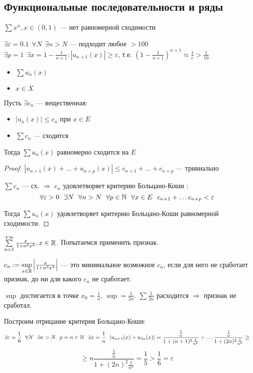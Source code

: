 

\cfoot{}



\subsection*{Функциональные последовательности и ряды}

\begin{example}
	$\sum x^n, x\in (0, 1)$ --- нет равномерной сходимости

	$\exists \varepsilon = 0.1 \ \ \forall N \ \ \exists n>N$ --- подходит любое $>100$ $\exists p = 1 \ \ \exists x = 1 - \frac{1}{n+1} : |u_{n+1}(x)| \ge \varepsilon$, т.е. $\left(1 - \frac{1}{n+1}\right)^{n+1} \approx \frac{1}{e} > \frac{1}{10}$
\end{example}

\begin{theorem}\itemfix
	\begin{itemize}
		\item $\sum u_n(x)$
		\item $x\in X$
	\end{itemize}
	Пусть $\exists c_n$ --- вещественная:
	\begin{itemize}
		\item $|u_n(x)| \le c_n$ при $x\in E$
		\item $\sum c_n$ --- сходится
	\end{itemize}
	Тогда $\sum u_n(x)$ равномерно сходится на $E$
\end{theorem}
\begin{proof}
	$|u_{n+1}(x) + \ldots + u_{n+p}(x)| \le c_{n+1} + \ldots + c_{n+p}$ --- тривиально

	$\sum c_n$ --- сх. $\Rightarrow$ $c_n$ удовлетворяет критерию Больцано-Коши : $$\forall \varepsilon > 0 \ \ \exists N \ \ \forall n > N \ \ \forall p\in \N \ \ \forall x\in E \ \ c_{n+1} + \ldots c_{n+p} < \varepsilon$$

	Тогда $\sum u_n(x)$ удовлетворяет критерию Больцано-Коши равномерной сходимости.
\end{proof}

\begin{example}
	$\sum\limits_{n=1}^{+\infty} \frac{x}{1+n^2x^2}, x\in\mathbb{R}$. Попытаемся применить признак.

	$c_n := \sup\limits_{x\in \mathbb{R}} \left|\frac{x}{1+n^2x^2}\right|$ --- это минимальное возможное $c_n$, если для него не сработает признак, до ни для какого $c_n$ не сработает.

	$\sup$ достигается в точке $x_0 = \frac{1}{n}$, $\sup = \frac{1}{2n}$. $\sum \frac{1}{2n}$ расходится $\Rightarrow$ признак не сработал.

	Построим отрицание критерия Больцано-Коши:
	$$\exists \varepsilon = \frac{1}{6} \ \ \forall N \ \ \exists n>N \ \ p=n\in\N \ \ \exists x=\frac{1}{n} \ \ |u_{n+1}(x) + u_{2n}(x)| = \frac{\frac{1}{n}}{1+(n+1)^2\frac{1}{n^2}} + \ldots \frac{\frac{1}{n}}{1+(2n)^2\frac{1}{n^2}} \ge$$
	$$\ge n \frac{\frac{1}{n}}{1+(2n)^2\frac{1}{n^2}} = \frac{1}{5} > \frac{1}{6} = \varepsilon$$
\end{example}


